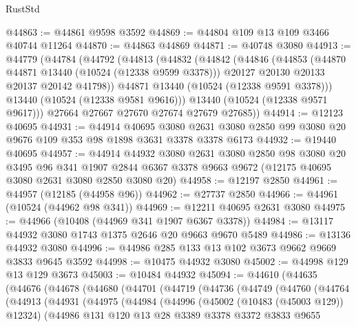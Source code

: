 \begin{lexlean}{RustStd}
\begin{coremodule}
@44863 := @44861 @9598 @3592
@44869 := @44804 @109 @13 @109 @3466 @40744 @11264
@44870 := @44863 @44869
@44871 := @40748 @3080
@44913 := @44779
    (@44784
      (@44792
        (@44813
          (@44832
            (@44842
              (@44846
                (@44853
                  (@44870 @44871 @13440 (@10524 (@12338 @9599 @3378)))
                  @20127
                  @20130
                  @20133
                  @20137
                  @20142
                  @41798))
              @44871
              @13440
              (@10524 (@12338 @9591 @3378)))
            @13440
            (@10524 (@12338 @9581 @9616)))
          @13440
          (@10524 (@12338 @9571 @9617)))
        @27664
        @27667
        @27670
        @27674
        @27679
        @27685))
@44914 := @12123 @40695
@44931 := @44914
    @40695
    @3080
    @2631
    @3080
    @2850
    @99
    @3080
    @20
    @9676
    @109
    @353
    @98
    @1898
    @3631
    @3378
    @3378
    @6173
@44932 := @19440 @40695
@44957 := @44914
    @44932
    @3080
    @2631
    @3080
    @2850
    @98
    @3080
    @20
    @3495
    @96
    @341
    @1907
    @2844
    @6367
    @3378
    @9663
    @9672
    (@12175 @40695 @3080 @2631 @3080 @2850 @3080 @20)
@44958 := @12197 @2850
@44961 := @44957 (@12185 (@44958 @96))
@44962 := @27737 @2850
@44966 := @44961 (@10524 (@44962 @98 @341))
@44969 := @12211 @40695 @2631 @3080
@44975 := @44966 (@10408 (@44969 @341 @1907 @6367 @3378))
@44984 := @13117 @44932 @3080 @1743 @1375 @2646 @20 @9663 @9670 @5489
@44986 := @13136 @44932 @3080
@44996 := @44986 @285 @133 @13 @102 @3673 @9662 @9669 @3833 @9645 @3592
@44998 := @10475 @44932 @3080
@45002 := @44998 @129 @13 @129 @3673
@45003 := @10484 @44932
@45094 := @44610
    (@44635
      (@44676
        (@44678
          (@44680
            (@44701
              (@44719
                (@44736
                  (@44749
                    (@44760
                      (@44764
                        (@44913
                          (@44931
                            (@44975
                              (@44984
                                (@44996
                                  (@45002 (@10483 (@45003 @129)) @12324)
                                  (@44986
                                    @131
                                    @120
                                    @13
                                    @28
                                    @3389
                                    @3378
                                    @3372
                                    @3833
                                    @9655

\end{coremodule}
\end{lexlean}
